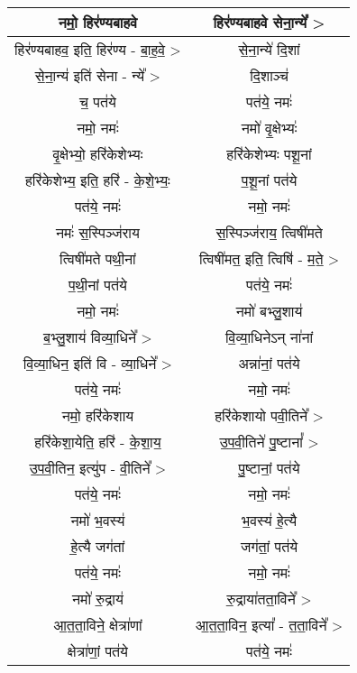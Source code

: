 {\centering
\begin{longtable}{|c|c|}
\hline
नमो॒ हिर॑ण्यबाहवे            & हिर॑ण्यबाहवे सेना॒न्ये᳚ >\\
\hline
हिर॑ण्यबाहव॒ इति॒ हिर॑ण्य - बा॒ह॒वे॒ >   & से॒ना॒न्ये॑ दि॒शां\\
\hline
से॒ना॒न्य॑ इति॑ सेना - न्ये᳚ >     & दि॒शाञ्च॑\\
\hline
च॒ पत॑ये                    & पत॑ये॒ नमः॑\\
\hline
नमो॒ नमः॑                  & नमो॑ वृ॒क्षेभ्यः॑\\
\hline
वृ॒क्षेभ्यो॒ हरि॑केशेभ्यः          & हरि॑केशेभ्यः पशू॒नां\\
\hline
हरि॑केशेभ्य॒ इति॒ हरि॑ - के॒शे॒भ्यः॒  & प॒शू॒नां पत॑ये\\
\hline
पत॑ये॒ नमः॑                  & नमो॒ नमः॑\\
\hline
नमः॑ स॒स्पिञ्ज॑राय            & स॒स्पिञ्ज॑राय॒ त्विषी॑मते\\
\hline
त्विषी॑मते पथी॒नां            & त्विषी॑मत॒ इति॒ त्विषि॑ - म॒ते॒ >\\
\hline
प॒थी॒नां पत॑ये                & पत॑ये॒ नमः॑\\
\hline
नमो॒ नमः॑                  & नमो॑ बभ्लु॒शाय॑\\
\hline
ब॒भ्लु॒शाय॑ विव्या॒धिने᳚ >        & वि॒व्या॒धिनेऽन् ना॑नां\\
\hline
वि॒व्या॒धिन॒ इति॑ वि - व्या॒धिने᳚ > & अन्ना॑नां॒ पत॑ये\\
\hline
पत॑ये॒ नमः॑                  & नमो॒ नमः॑\\
\hline
नमो॒ हरि॑केशाय              & हरि॑केशायो पवी॒तिने᳚ >\\
\hline
हरि॑केशा॒येति॒ हरि॑ - के॒शा॒य॒     & उ॒प॒वी॒तिने॑ पु॒ष्टानां᳚ >\\
\hline
उ॒प॒वी॒तिन॒ इत्यु॑प - वी॒तिने᳚ >   & पु॒ष्टानां॒ पत॑ये\\
\hline
पत॑ये॒ नमः॑                  & नमो॒ नमः॑\\
\hline
नमो॑ भ॒वस्य॑                 & भ॒वस्य॑ हे॒त्यै\\
\hline
हे॒त्यै जग॑तां                 & जग॑तां॒ पत॑ये\\
\hline
पत॑ये॒ नमः॑                  & नमो॒ नमः॑\\
\hline
नमो॑ रु॒द्राय॑                & रु॒द्राया॑तता॒विने᳚ >\\
\hline
आ॒त॒ता॒विने॒ क्षेत्रा॑णां          & आ॒त॒ता॒विन॒ इत्या᳚ - त॒ता॒विने᳚ >\\
\hline
क्षेत्रा॑णां॒ पत॑ये              & पत॑ये॒ नमः॑\\
\hline

\end{longtable}}
